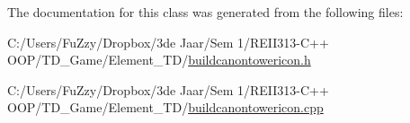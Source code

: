 The documentation for this class was generated from the following files\+:\begin{DoxyCompactItemize}
\item 
C\+:/\+Users/\+Fu\+Zzy/\+Dropbox/3de Jaar/\+Sem 1/\+R\+E\+I\+I313-\/\+C++ O\+O\+P/\+T\+D\+\_\+\+Game/\+Element\+\_\+\+T\+D/\hyperlink{buildcanontowericon_8h}{buildcanontowericon.\+h}\item 
C\+:/\+Users/\+Fu\+Zzy/\+Dropbox/3de Jaar/\+Sem 1/\+R\+E\+I\+I313-\/\+C++ O\+O\+P/\+T\+D\+\_\+\+Game/\+Element\+\_\+\+T\+D/\hyperlink{buildcanontowericon_8cpp}{buildcanontowericon.\+cpp}\end{DoxyCompactItemize}
